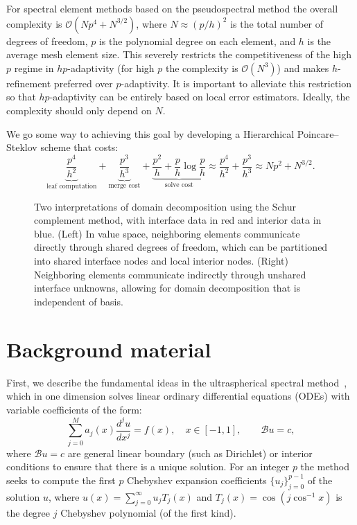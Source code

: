 \documentclass[review]{siamart171218}
\begin{document}
For spectral element methods based on the pseudospectral method the overall complexity is $\mathcal{O}(Np^4 + N^{3/2})$, where $N \approx (p/h)^2$ is the total number of degrees of freedom, $p$ is the polynomial degree on each element, and $h$ is the average mesh element size. This  severely restricts the competitiveness of the high $p$ regime in $hp$-adaptivity (for high $p$ the complexity is $\mathcal{O}(N^3)$) and makes $h$-refinement preferred over $p$-adaptivity. It is important to alleviate this restriction so that $hp$-adaptivity can be entirely based on local error estimators. Ideally, the complexity should only depend on $N$.

We go some way to achieving this goal by developing a Hierarchical Poincare--Steklov scheme that costs:
\[
 \underbrace{\frac{p^4}{h^2}}_{\text{leaf computation}} + \underbrace{\frac{p^3}{h^3}}_{\text{merge cost}} + \underbrace{\frac{p^2}{h} + \frac{p}{h}\log \frac{p}{h}}_{\text{solve cost}} \approx \frac{p^4}{h^2} + \frac{p^3}{h^3} \approx Np^2 + N^{3/2}. 
\]

\begin{figure}[htb]
  \centering
  \begin{minipage}{0.49\textwidth}
    \begin{center}
      \small
      \scalebox{0.4}{}
    \end{center}
  \end{minipage}%
  \begin{minipage}{0.49\textwidth}
    \begin{center}
      \small
      \scalebox{0.42}{}
    \end{center}
  \end{minipage}
  \vspace{1em}
  \caption{Two interpretations of domain decomposition using the Schur complement method, with interface data in red and interior data in blue. (Left) In value space, neighboring elements communicate directly through shared degrees of freedom, which can be partitioned into shared interface nodes and local interior nodes. (Right) Neighboring elements communicate indirectly through unshared interface unknowns, allowing for domain decomposition that is independent of basis.}
  \label{fig:dd_interpretations}
\end{figure}

\section{Background material}\label{sec:background}
First, we describe the fundamental ideas in the ultraspherical spectral method~\cite{Olver_13_01}, which in one dimension solves linear ordinary differential equations (ODEs) with variable coefficients of the form: 
\[
\sum_{j=0}^M a_j(x)\frac{d^ju}{dx^j} = f(x), \quad x\in[-1,1], \qquad \mathcal{B}u = c, 
\]
where $\mathcal{B}u=c$ are general linear boundary (such as Dirichlet) or interior conditions to ensure that there is a unique solution. For an integer $p$ the method seeks to compute the first $p$ Chebyshev expansion coefficients $\{u_j\}_{j=0}^{p-1}$ of the solution $u$, where $u(x) = \sum_{j=0}^\infty u_j T_j(x)$ and $T_j(x) = \cos(j\cos^{-1}x)$ is the degree $j$ Chebyshev polynomial (of the first kind). 
\end{document}
